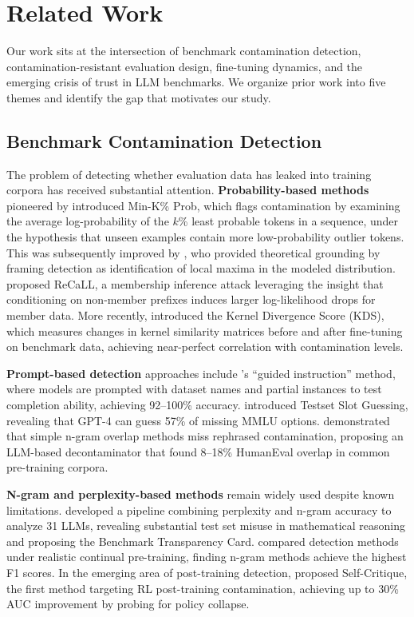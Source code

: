 \section{Related Work}
\label{sec:related}

Our work sits at the intersection of benchmark contamination detection, contamination-resistant evaluation design, fine-tuning dynamics, and the emerging crisis of trust in LLM benchmarks. We organize prior work into five themes and identify the gap that motivates our study.

\subsection{Benchmark Contamination Detection}

The problem of detecting whether evaluation data has leaked into training corpora has received substantial attention. \textbf{Probability-based methods} pioneered by \citet{shi2024detecting} introduced Min-K\% Prob, which flags contamination by examining the average log-probability of the $k$\% least probable tokens in a sequence, under the hypothesis that unseen examples contain more low-probability outlier tokens. This was subsequently improved by \citet{zhang2025minkpp}, who provided theoretical grounding by framing detection as identification of local maxima in the modeled distribution. \citet{xie2024recall} proposed ReCaLL, a membership inference attack leveraging the insight that conditioning on non-member prefixes induces larger log-likelihood drops for member data. More recently, \citet{choi2025kernel} introduced the Kernel Divergence Score (KDS), which measures changes in kernel similarity matrices before and after fine-tuning on benchmark data, achieving near-perfect correlation with contamination levels.

\textbf{Prompt-based detection} approaches include \citet{golchin2024timetravel}'s ``guided instruction'' method, where models are prompted with dataset names and partial instances to test completion ability, achieving 92--100\% accuracy. \citet{deng2024investigating} introduced Testset Slot Guessing, revealing that GPT-4 can guess 57\% of missing MMLU options. \citet{yang2024rethinking} demonstrated that simple n-gram overlap methods miss rephrased contamination, proposing an LLM-based decontaminator that found 8--18\% HumanEval overlap in common pre-training corpora.

\textbf{N-gram and perplexity-based methods} remain widely used despite known limitations. \citet{zhou2024benchmarking} developed a pipeline combining perplexity and n-gram accuracy to analyze 31 LLMs, revealing substantial test set misuse in mathematical reasoning and proposing the Benchmark Transparency Card. \citet{simulating2025leakage} compared detection methods under realistic continual pre-training, finding n-gram methods achieve the highest F1 scores. In the emerging area of post-training detection, \citet{selfcritique2025rl} proposed Self-Critique, the first method targeting RL post-training contamination, achieving up to 30\% AUC improvement by probing for policy collapse.


